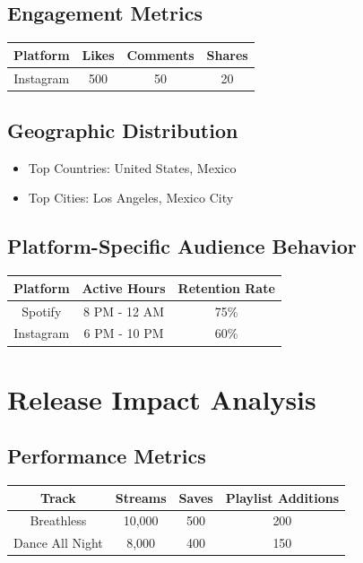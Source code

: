 \documentclass{report}
\begin{document}
\subsection{Engagement Metrics}

\begin{tabular}{|c|c|c|c|}
    \hline
    \textbf{Platform} & \textbf{Likes} & \textbf{Comments} & \textbf{Shares} \\
    \hline
    Instagram & 500 & 50 & 20 \\
    \hline
\end{tabular}

\subsection{Geographic Distribution}

\begin{itemize}
    \item Top Countries: United States, Mexico
    \item Top Cities: Los Angeles, Mexico City
\end{itemize}

\subsection{Platform-Specific Audience Behavior}

\begin{tabular}{|c|c|c|}
    \hline
    \textbf{Platform} & \textbf{Active Hours} & \textbf{Retention Rate} \\
    \hline
    Spotify & 8 PM - 12 AM & 75\% \\
    Instagram & 6 PM - 10 PM & 60\% \\
    \hline
\end{tabular}

\newpage

\section{Release Impact Analysis}

\subsection{Performance Metrics}

\begin{tabular}{|c|c|c|c|}
    \hline
    \textbf{Track} & \textbf{Streams} & \textbf{Saves} & \textbf{Playlist Additions} \\
    \hline
    Breathless & 10,000 & 500 & 200 \\
    Dance All Night & 8,000 & 400 & 150 \\
    \hline
\end{tabular}
\end{document}
